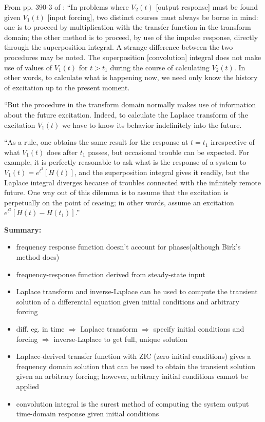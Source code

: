 \documentclass[10pt,letterpaper]{article}
\begin{document}
From pp. 390-3 of \citet{bracewell00.1}: ``In problems where $V_2(t)$ [output response] must be found given $V_1(t)$ [input forcing], two distinct courses must always be borne in mind: one is to proceed by multiplication with the transfer function in the transform domain; the other method is to proceed, by use of the impulse response, directly through the superposition integral.
A strange difference between the two procedures may be noted.
The superposition [convolution] integral does not make use of values of $V_1(t)$ for $t > t_1$ during the course of calculating $V_2(t)$.
In other words, to calculate what is happening now, we need only know the history of excitation up to the present moment.

``But the procedure in the transform domain normally makes use of information about the future excitation.
Indeed, to calculate the Laplace transform of the excitation $V_1(t)$ we have to know its behavior indefinitely into the future.

``As a rule, one obtains the same result for the response at $t=t_1$ irrespective of what $V_1(t)$ does after $t_1$ passes, but occasional trouble can be expected. 
For example, it is perfectly reasonable to ask what is the response of a system to $V_1(t) = e^{t^2}[H(t)]$, and the superposition integral gives it readily, but the Laplace integral diverges because of troubles connected with the infinitely remote future.
One way out of this dilemma is to assume that the excitation is perpetually on the point of ceasing; in other words, assume an excitation $e^{t^2}[H(t) - H(t_1)]$.''

\textbf{Summary:}
\begin{itemize}
	\item frequency response function doesn't account for phases(although Birk's method does)
	\item frequency-response function derived from steady-state input	
	\item Laplace transform and inverse-Laplace can be used to compute the transient solution of a differential equation given initial conditions and arbitrary forcing
	\item diff. eg. in time $\Rightarrow$ Laplace transform $\Rightarrow$ specify initial conditions and forcing $\Rightarrow$ inverse-Laplace to get full, unique solution
	\item Laplace-derived transfer function with ZIC (zero initial conditions) gives a frequency domain solution that can be used to obtain the transient solution given an arbitrary forcing; however, arbitrary initial conditions cannot be applied
	\item convolution integral is the surest method of computing the system output time-domain response given initial conditions
\end{itemize}
\end{document}
